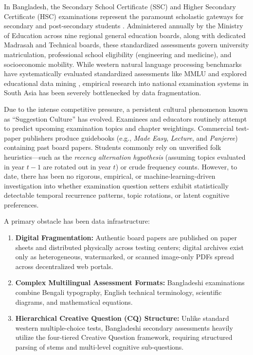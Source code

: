 \documentclass[11pt,a4paper]{article}
\begin{document}
In Bangladesh, the Secondary School Certificate (SSC) and Higher Secondary Certificate (HSC) examinations represent the paramount scholastic gateways for secondary and post-secondary students \cite{nctb2012curriculum, unesco2019bangladesh}. Administered annually by the Ministry of Education across nine regional general education boards, along with dedicated Madrasah and Technical boards, these standardized assessments govern university matriculation, professional school eligibility (engineering and medicine), and socioeconomic mobility. While western natural language processing benchmarks have systematically evaluated standardized assessments like MMLU \cite{hendrycks2021measuring} and explored educational data mining \cite{baker2009educational}, empirical research into national examination systems in South Asia has been severely bottlenecked by data fragmentation.

Due to the intense competitive pressure, a persistent cultural phenomenon known as ``Suggestion Culture'' has evolved. Examinees and educators routinely attempt to predict upcoming examination topics and chapter weightings. Commercial test-paper publishers produce guidebooks (e.g., \textit{Made Easy}, \textit{Lecture}, and \textit{Panjeree}) containing past board papers. Students commonly rely on unverified folk heuristics---such as the \textit{recency alternation hypothesis} (assuming topics evaluated in year $t-1$ are rotated out in year $t$) or crude frequency counts. However, to date, there has been no rigorous, empirical, or machine-learning-driven investigation into whether examination question setters exhibit statistically detectable temporal recurrence patterns, topic rotations, or latent cognitive preferences.

A primary obstacle has been data infrastructure:
\begin{enumerate}[noitemsep,topsep=2pt]
    \item \textbf{Digital Fragmentation:} Authentic board papers are published on paper sheets and distributed physically across testing centers; digital archives exist only as heterogeneous, watermarked, or scanned image-only PDFs spread across decentralized web portals.
    \item \textbf{Complex Multilingual Assessment Formats:} Bangladeshi examinations combine Bengali typography, English technical terminology, scientific diagrams, and mathematical equations.
    \item \textbf{Hierarchical Creative Question (CQ) Structure:} Unlike standard western multiple-choice tests, Bangladeshi secondary assessments heavily utilize the four-tiered Creative Question framework, requiring structured parsing of stems and multi-level cognitive sub-questions.
\end{enumerate}
\end{document}
